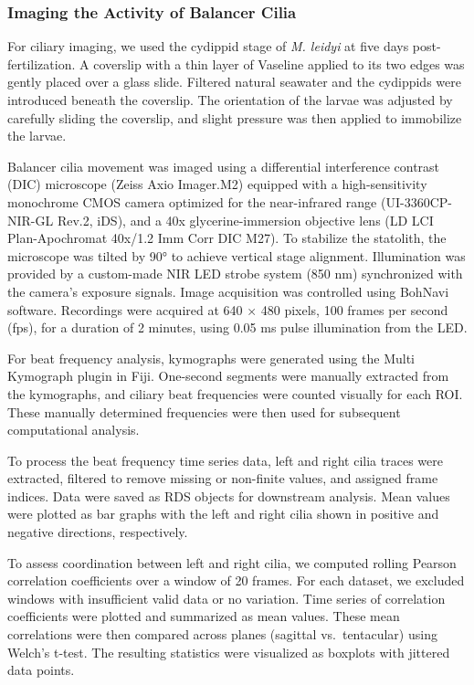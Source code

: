\documentclass[
  11pt,
]{article}
\begin{document}
\subsubsection{Imaging the Activity of Balancer
Cilia}\label{imaging-the-activity-of-balancer-cilia}

For ciliary imaging, we used the cydippid stage of \emph{M. leidyi} at
five days post-fertilization. A coverslip with a thin layer of Vaseline
applied to its two edges was gently placed over a glass slide. Filtered
natural seawater and the cydippids were introduced beneath the
coverslip. The orientation of the larvae was adjusted by carefully
sliding the coverslip, and slight pressure was then applied to
immobilize the larvae.

Balancer cilia movement was imaged using a differential interference
contrast (DIC) microscope (Zeiss Axio Imager.M2) equipped with a
high-sensitivity monochrome CMOS camera optimized for the near-infrared
range (UI-3360CP-NIR-GL Rev.2, iDS), and a 40x glycerine-immersion
objective lens (LD LCI Plan-Apochromat 40x/1.2 Imm Corr DIC M27). To
stabilize the statolith, the microscope was tilted by 90° to achieve
vertical stage alignment. Illumination was provided by a custom-made NIR
LED strobe system (850 nm) synchronized with the camera's exposure
signals. Image acquisition was controlled using BohNavi software.
Recordings were acquired at 640 × 480 pixels, 100 frames per second
(fps), for a duration of 2 minutes, using 0.05 ms pulse illumination
from the LED.

For beat frequency analysis, kymographs were generated using the Multi
Kymograph plugin in Fiji. One-second segments were manually extracted
from the kymographs, and ciliary beat frequencies were counted visually
for each ROI. These manually determined frequencies were then used for
subsequent computational analysis.

To process the beat frequency time series data, left and right cilia
traces were extracted, filtered to remove missing or non-finite values,
and assigned frame indices. Data were saved as RDS objects for
downstream analysis. Mean values were plotted as bar graphs with the
left and right cilia shown in positive and negative directions,
respectively.

To assess coordination between left and right cilia, we computed rolling
Pearson correlation coefficients over a window of 20 frames. For each
dataset, we excluded windows with insufficient valid data or no
variation. Time series of correlation coefficients were plotted and
summarized as mean values. These mean correlations were then compared
across planes (sagittal vs.~tentacular) using Welch's t-test. The
resulting statistics were visualized as boxplots with jittered data
points.
\end{document}
